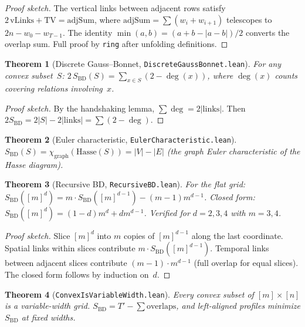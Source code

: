 \documentclass[11pt,a4paper]{article}
\newtheorem{theorem}{Theorem}[section]
\theoremstyle{remark}
\begin{document}
\begin{proof}[Proof sketch]
The vertical links between adjacent rows satisfy
$2\,\mathrm{vLinks} + \mathrm{TV} = \mathrm{adjSum}$, where
$\mathrm{adjSum} = \sum(w_i + w_{i+1})$ telescopes to $2n - w_0 - w_{T-1}$.
The identity $\min(a,b) = (a + b - |a-b|)/2$ converts the overlap sum.
Full proof by \texttt{ring} after unfolding definitions.
\end{proof}

\begin{theorem}[Discrete Gauss--Bonnet, \texttt{DiscreteGaussBonnet.lean}]
For any convex subset~$S$:
$2\,S_{\mathrm{BD}}(S) = \sum_{x \in S} (2 - \deg(x))$,
where $\deg(x)$ counts covering relations involving~$x$.
\end{theorem}

\begin{proof}[Proof sketch]
By the handshaking lemma, $\sum\deg = 2|\mathrm{links}|$.
Then $2S_{\mathrm{BD}} = 2|S| - 2|\mathrm{links}| = \sum(2-\deg)$.
\end{proof}

\begin{theorem}[Euler characteristic, \texttt{EulerCharacteristic.lean}]
$S_{\mathrm{BD}}(S) = \chi_{\mathrm{graph}}(\mathrm{Hasse}(S)) = |V| - |E|$
(the graph Euler characteristic of the Hasse diagram).
\end{theorem}

\begin{theorem}[Recursive BD, \texttt{RecursiveBD.lean}]
\label{thm:recursive}
For the flat grid:
$S_{\mathrm{BD}}([m]^d) = m \cdot S_{\mathrm{BD}}([m]^{d-1}) - (m{-}1)m^{d-1}$.
Closed form: $S_{\mathrm{BD}}([m]^d) = (1{-}d)m^d + dm^{d-1}$.
Verified for $d = 2,3,4$ with $m = 3,4$.
\end{theorem}

\begin{proof}[Proof sketch]
Slice $[m]^d$ into $m$ copies of $[m]^{d-1}$ along the last coordinate.
Spatial links within slices contribute $m \cdot S_{\mathrm{BD}}([m]^{d-1})$.
Temporal links between adjacent slices contribute $(m{-}1) \cdot m^{d-1}$
(full overlap for equal slices). The closed form follows by induction on~$d$.
\end{proof}

\begin{theorem}[\texttt{ConvexIsVariableWidth.lean}]
Every convex subset of $[m] \times [n]$ is a variable-width grid.
$S_{\mathrm{BD}} = T' - \sum\mathrm{overlaps}$, and left-aligned profiles
minimize $S_{\mathrm{BD}}$ at fixed widths.
\end{theorem}
\end{document}
